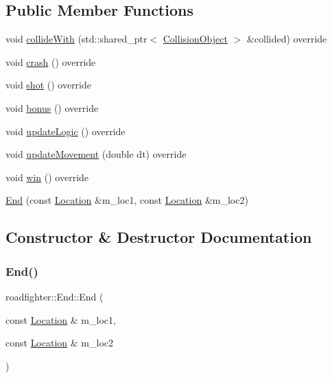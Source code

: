\subsection*{Public Member Functions}
\begin{DoxyCompactItemize}
\item 
void \hyperlink{classroadfighter_1_1End_a56dfbe6f0c760a5728b58fc9d9f40486}{collide\+With} (std\+::shared\+\_\+ptr$<$ \hyperlink{classroadfighter_1_1CollisionObject}{Collision\+Object} $>$ \&collided) override
\item 
void \hyperlink{classroadfighter_1_1End_af88fbaf5ebd266bd153d0ba3f32ba0f8}{crash} () override
\item 
void \hyperlink{classroadfighter_1_1End_af81f5e854c8504a60afa11ea826aaec8}{shot} () override
\item 
void \hyperlink{classroadfighter_1_1End_a501a09cafb9de82e3a6af39e9524eb3d}{bonus} () override
\item 
void \hyperlink{classroadfighter_1_1End_aee4a4fed3e7bd5f85f183351280e54f9}{update\+Logic} () override
\item 
void \hyperlink{classroadfighter_1_1End_a6ea4afe8b07f96801fb2a67b82d6b71c}{update\+Movement} (double dt) override
\item 
void \hyperlink{classroadfighter_1_1End_abcf20b9e8a2dda73a9215eb8c01c4aef}{win} () override
\item 
\hyperlink{classroadfighter_1_1End_ab5806203f3fb473a220b3cce19f2fb0c}{End} (const \hyperlink{classroadfighter_1_1Location}{Location} \&m\+\_\+loc1, const \hyperlink{classroadfighter_1_1Location}{Location} \&m\+\_\+loc2)
\end{DoxyCompactItemize}


\subsection{Constructor \& Destructor Documentation}
\mbox{\label{classroadfighter_1_1End_ab5806203f3fb473a220b3cce19f2fb0c}} 
\subsubsection{\texorpdfstring{End()}{End()}}
{\footnotesize\ttfamily roadfighter\+::\+End\+::\+End (\begin{DoxyParamCaption}\item[{const \hyperlink{classroadfighter_1_1Location}{Location} \&}]{m\+\_\+loc1,  }\item[{const \hyperlink{classroadfighter_1_1Location}{Location} \&}]{m\+\_\+loc2 }\end{DoxyParamCaption})}


